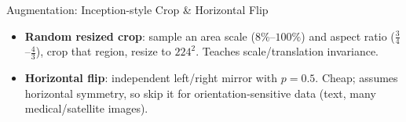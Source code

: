 \begin{frame}{Augmentation: Inception-style Crop \& Horizontal Flip}
\begin{center}
  \end{center}
  \vspace{0.6em}
  \begin{itemize}
    \item \textbf{Random resized crop}: sample an area scale ($8\%$--$100\%$) and aspect ratio ($\tfrac34$--$\tfrac43$), crop that region, resize to $224^2$. Teaches scale/translation invariance.
    \item \textbf{Horizontal flip}: independent left/right mirror with $p{=}0.5$. Cheap; assumes horizontal symmetry, so skip it for orientation-sensitive data (text, many medical/satellite images).
  \end{itemize}
\end{frame}

